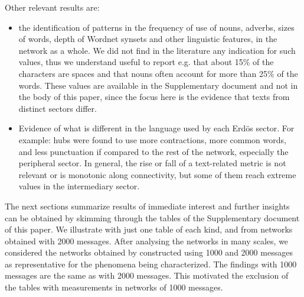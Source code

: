 \documentclass[review]{elsarticle}
\begin{document}
Other relevant results are:
\begin{itemize}
\item the identification of patterns in the frequency of use of nouns, adverbs, sizes of words, depth of Wordnet synsets and other linguistic features, in the network as a whole.
  We did not find in the literature any indication for such values, thus we understand useful to report e.g. that about 15\% of the characters are spaces and that nouns often account for more than 25\% of the words.
These values are available in the Supplementary document and not in the body of this paper,
since the focus here is the evidence that texts from distinct sectors differ.
\item Evidence of what is different in the language used by each Erd\"os sector. For example: hubs were found to use more contractions,
more common words, and less punctuation if compared to the rest of the network,
especially the peripheral sector.
In general, the rise or fall of a text-related metric is not relevant or is monotonic along connectivity,
but some of them reach extreme values in the intermediary sector.
\end{itemize}

The next sections summarize results of immediate interest
and further insights can be obtained by skimming through
the tables of the Supplementary document of this paper.
We illustrate with just one table of each kind,
and from networks obtained with 2000 messages.
After analysing the networks in many scales,
we considered the networks obtained by constructed using 1000 and 2000 messages as representative for the phenomena being characterized.
The findings with 1000 messages are the same as with 2000 messages.
This motivated the exclusion of the tables with measurements in
networks of 1000 messages.
\end{document}
